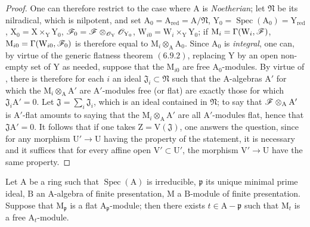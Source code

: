 \begin{proof}
One can therefore restrict to the case where $\mathrm{A}$ is \emph{Noetherian}; let $\mathfrak{N}$ be its nilradical, which is
nilpotent, and set $\mathrm{A}_0=\mathrm{A}_{\mathrm{red}}=\mathrm{A}/\mathfrak{N}$, $\mathrm{Y}_0=\operatorname{Spec}(\mathrm{A}_0)=\mathrm{Y}_{\mathrm{red}}$, $\mathrm{X}_0=\mathrm{X}\times_\mathrm{Y}\mathrm{Y}_0$, $\mathscr{F}_0=\mathscr{F}\otimes_{\mathscr{O}_\mathrm{Y}}\mathscr{O}_{\mathrm{Y}_0}$,
$\mathrm{W}_{i0}=\mathrm{W}_i\times_\mathrm{Y}\mathrm{Y}_0$; if $\mathrm{M}_i=\Gamma(\mathrm{W}_i,\mathscr{F})$, $\mathrm{M}_{i0}=\Gamma(\mathrm{W}_{i0},\mathscr{F}_0)$ is therefore equal to $\mathrm{M}_i\otimes_\mathrm{A}\mathrm{A}_0$.
Since $\mathrm{A}_0$ is \emph{integral}, one can, by virtue of the generic flatness theorem $(6.9.2)$,
replacing $\mathrm{Y}$ by an open non-empty set of $\mathrm{Y}$ as needed, suppose that the $\mathrm{M}_{i0}$ are
free $\mathrm{A}_0$-modules. By virtue of , there is therefore for each $i$ an ideal $\mathfrak{J}_i\subset\mathfrak{N}$ such
that the $\mathrm{A}$-algebras $\mathrm{A}'$ for which the $\mathrm{M}_i\otimes_\mathrm{A}\mathrm{A}'$ are $\mathrm{A}'$-modules free (or flat)
are exactly those for which $\mathfrak{J}_i\mathrm{A}'=0$. Let $\mathfrak{J}=\sum_i\mathfrak{J}_i$, which is an ideal contained
in $\mathfrak{N}$; to say that $\mathscr{F}\otimes_{\mathrm{A}}\mathrm{A}'$ is $\mathrm{A}'$-flat amounts to saying that the $\mathrm{M}_i\otimes_\mathrm{A}\mathrm{A}'$ are all
$\mathrm{A}'$-modules flat, hence that $\mathfrak{J}\mathrm{A}'=0$. It follows that if one takes $\mathrm{Z}=\mathrm{V}(\mathfrak{J})$, one
answers the question, since for any morphism $\mathrm{U}'\to\mathrm{U}$ having the property of the statement,
it is necessary and it suffices that for every affine open $\mathrm{V}'\subset\mathrm{U}'$, the morphism $\mathrm{V}'\to\mathrm{U}$
have the same property.
\end{proof}

\begin{corollary}[11.4.6]
\label{IV.11.4.6}
Let $\mathrm{A}$ be a ring such that $\operatorname{Spec}(\mathrm{A})$ is irreducible, $\mathfrak{p}$ its unique
minimal prime ideal, $\mathrm{B}$ an $\mathrm{A}$-algebra of finite presentation, $\mathrm{M}$ a $\mathrm{B}$-module of finite presentation.
Suppose that $\mathrm{M}_\mathfrak{p}$ is a flat $\mathrm{A}_\mathfrak{p}$-module; then there exists $t\in\mathrm{A}-\mathfrak{p}$ such that $\mathrm{M}_t$ is a free $\mathrm{A}_t$-module.
\end{corollary}

